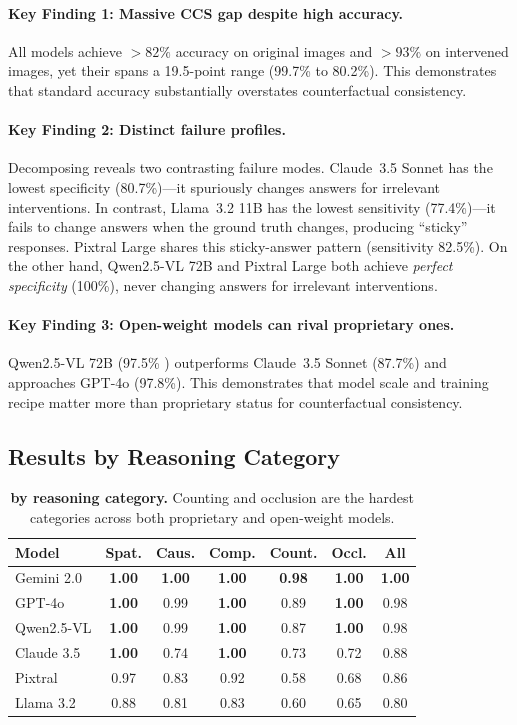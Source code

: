 \paragraph{Key Finding 1: Massive CCS gap despite high accuracy.}
All models achieve $>82\%$ accuracy on original images and $>93\%$ on intervened images, yet their \ccs spans a 19.5-point range (99.7\% to 80.2\%). This demonstrates that standard accuracy substantially overstates counterfactual consistency.

\paragraph{Key Finding 2: Distinct failure profiles.}
Decomposing \ccs reveals two contrasting failure modes. Claude~3.5 Sonnet has the lowest specificity (80.7\%)---it spuriously changes answers for irrelevant interventions. In contrast, Llama~3.2 11B has the lowest sensitivity (77.4\%)---it fails to change answers when the ground truth changes, producing ``sticky'' responses. Pixtral Large shares this sticky-answer pattern (sensitivity 82.5\%). On the other hand, Qwen2.5-VL 72B and Pixtral Large both achieve \emph{perfect specificity} (100\%), never changing answers for irrelevant interventions.

\paragraph{Key Finding 3: Open-weight models can rival proprietary ones.}
Qwen2.5-VL 72B (97.5\% \ccs) outperforms Claude~3.5 Sonnet (87.7\%) and approaches GPT-4o (97.8\%). This demonstrates that model scale and training recipe matter more than proprietary status for counterfactual consistency.

\subsection{Results by Reasoning Category}

\begin{table}[t]
\centering
\caption{\textbf{\ccs by reasoning category.} Counting and occlusion are the hardest categories across both proprietary and open-weight models.}
\label{tab:category_results}
\small
\setlength{\tabcolsep}{2.8pt}
\begin{tabular}{@{}l c c c c c c@{}}
\toprule
Model & Spat. & Caus. & Comp. & Count. & Occl. & All \\
\midrule
Gemini 2.0 & \textbf{1.00} & \textbf{1.00} & \textbf{1.00} & \textbf{0.98} & \textbf{1.00} & \textbf{1.00} \\
GPT-4o & \textbf{1.00} & 0.99 & \textbf{1.00} & 0.89 & \textbf{1.00} & 0.98 \\
Qwen2.5-VL & \textbf{1.00} & 0.99 & \textbf{1.00} & 0.87 & \textbf{1.00} & 0.98 \\
Claude 3.5 & \textbf{1.00} & 0.74 & \textbf{1.00} & 0.73 & 0.72 & 0.88 \\
Pixtral & 0.97 & 0.83 & 0.92 & 0.58 & 0.68 & 0.86 \\
Llama 3.2 & 0.88 & 0.81 & 0.83 & 0.60 & 0.65 & 0.80 \\
\bottomrule
\end{tabular}
\end{table}

